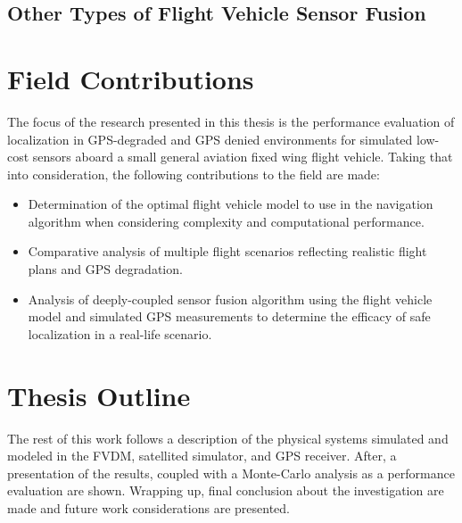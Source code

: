 \subsection{Other Types of Flight Vehicle Sensor Fusion}

\section{Field Contributions}
The focus of the research presented in this thesis is the performance evaluation of localization in GPS-degraded and GPS denied environments for simulated low-cost sensors aboard a small general aviation fixed wing flight vehicle. Taking that into consideration, the following contributions to the field are made:
\begin{itemize}
    \item Determination of the optimal flight vehicle model to use in the navigation algorithm when considering complexity and computational performance.
    \item Comparative analysis of multiple flight scenarios reflecting realistic flight plans and GPS degradation.
    \item Analysis of deeply-coupled sensor fusion algorithm using the flight vehicle model and simulated GPS measurements to determine the efficacy of safe localization in a real-life scenario.
\end{itemize}

\section{Thesis Outline}
The rest of this work follows a description of the physical systems simulated and modeled in the FVDM, satellited simulator, and GPS receiver. After, a presentation of the results, coupled with a Monte-Carlo analysis as a performance evaluation are shown. Wrapping up, final conclusion about the investigation are made and future work considerations are presented.